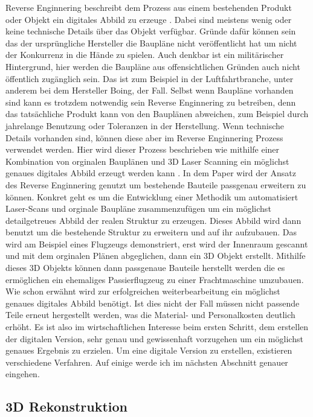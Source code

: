 \documentclass[../main.tex]{subfiles}
\begin{document}
Reverse Enginnering beschreibt dem Prozess aus einem bestehenden Produkt 
oder Objekt ein digitales Abbild zu erzeuge \cite{Helle.2021}.
Dabei sind meistens wenig oder keine technische Details über das Objekt
verfügbar. Gründe dafür können sein das der ursprüngliche Hersteller
die Baupläne nicht veröffentlicht hat um nicht der Konkurrenz in die Hände
zu spielen. Auch denkbar ist ein militärischer Hintergrund, hier werden
die Baupläne aus offensichtlichen Gründen auch nicht öffentlich zugänglich
sein. Das ist zum Beispiel in der Luftfahrtbranche, unter anderem bei dem
Hersteller Boing, der Fall. 
Selbst wenn Baupläne vorhanden sind kann es trotzdem notwendig sein 
Reverse Enginnering zu betreiben, denn das tatsächliche Produkt kann von
den Bauplänen abweichen, zum Beispiel durch jahrelange Benutzung oder
Toleranzen in der Herstellung. Wenn technische Details vorhanden sind,
können diese aber im Reverse Enginnering Prozess verwendet werden.
Hier wird dieser Prozess beschrieben wie mithilfe einer Kombination von
orginalen Bauplänen und 3D Laser Scanning ein möglichst genaues digitales
Abbild erzeugt werden kann \cite{Monchinger.2021}.
In dem Paper wird der Ansatz des Reverse Enginnering genutzt um
bestehende Bauteile passgenau erweitern zu können. Konkret geht es um die
Entwicklung einer Methodik um automatisiert Laser-Scans und orginale Baupläne
zusammenzufügen um ein möglichst detailgetreues Abbild der realen Struktur zu
erzeugen. Dieses Abbild wird dann benutzt um die bestehende Struktur zu 
erweitern und auf ihr aufzubauen. Das wird am Beispiel eines Flugzeugs 
demonstriert, erst wird der Innenraum gescannt und mit dem orginalen Plänen
abgeglichen, dann ein 3D Objekt erstellt. Mithilfe dieses 3D Objekts können 
dann passgenaue Bauteile herstellt werden die es ermöglichen ein ehemaliges 
Passierflugzeug zu einer Frachtmaschine umzubauen.
Wie schon erwähnt wird zur erfolgreichen weiterbearbeitung ein möglichst 
genaues digitales Abbild benötigt.
Ist dies nicht der Fall müssen nicht passende Teile erneut hergestellt werden, 
was die Material- und Personalkosten deutlich erhöht. Es ist also im 
wirtschaftlichen Interesse beim ersten Schritt, dem erstellen der digitalen 
Version, sehr genau und gewissenhaft vorzugehen um ein möglichst genaues Ergebnis
zu erzielen. Um eine digitale Version zu erstellen, existieren verschiedene Verfahren.
Auf einige werde ich im nächsten Abschnitt genauer eingehen.


\subsection{3D Rekonstruktion}
\end{document}
